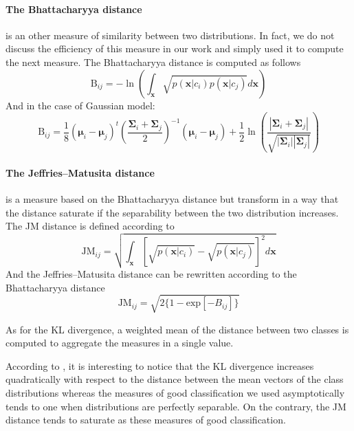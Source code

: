 \documentclass[a4paper]{article}
\begin{document}
        \paragraph{The Bhattacharyya distance} is an other measure of similarity between two distributions. In fact, we do not discuss the efficiency of this measure in our work and simply used it to compute the next measure. The Bhattacharyya distance is computed as follows
        \begin{equation}
            \text{B}_{ij} = - \ln \left( \int_\mathbf{x} \sqrt{p(\mathbf{x}|c_i) p(\mathbf{x}|c_j)} d\mathbf{x} \right)
        \end{equation}
        And in the case of Gaussian model:
        \begin{equation}
            \text{B}_{ij} = \frac{1}{8} (\boldsymbol{\mu}_i - \boldsymbol{\mu}_j)^t \left( \frac{\boldsymbol{\Sigma}_i + \boldsymbol{\Sigma}_j}{2} \right)^{-1} (\boldsymbol{\mu}_i - \boldsymbol{\mu}_j) + \frac{1}{2} \ln \left( \frac{|\boldsymbol{\Sigma}_i + \boldsymbol{\Sigma}_j|}{\sqrt{|\boldsymbol{\Sigma}_i| |\boldsymbol{\Sigma}_j|}} \right)
        \end{equation}

        \paragraph{The Jeffries–Matusita distance} is a measure based on the Bhattacharyya distance but transform in a way that the distance saturate if the separability between the two distribution increases. The JM distance is defined according to
        \begin{equation}
            \text{JM}_{ij} = \sqrt{ \int_\mathbf{x} \left[\sqrt{p(\mathbf{x}|c_i)} - \sqrt{p(\mathbf{x}|c_j)}\right]^2 d\mathbf{x} }
        \end{equation}
        And the Jeffries–Matusita distance can be rewritten according to the Bhattacharyya distance
        \begin{equation}
            \text{JM}_{ij} = \sqrt{ 2 \{1 - \text{exp}[-B_{ij}]\} }
        \end{equation}

        As for the KL divergence, a weighted mean of the distance between two classes is computed to aggregate the measures in a single value.

        \vspace{10 mm}

        According to \cite{bruzzone2009novel}, it is interesting to notice that the KL divergence increases quadratically with respect to the distance between the mean vectors of the class distributions whereas the measures of good classification we used asymptotically tends to one when distributions are perfectly separable. On the contrary, the JM distance tends to saturate as these measures of good classification.
\end{document}
